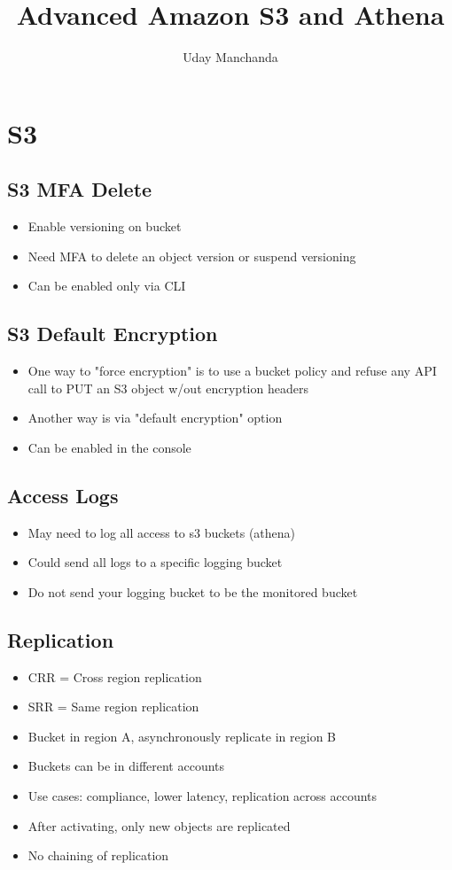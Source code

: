\documentclass[]{scrartcl}
\title{Advanced Amazon S3 and Athena}
\author{Uday Manchanda}
\begin{document}
\maketitle

\section{S3}

\subsection{S3 MFA Delete}
\begin{itemize}
	\item Enable versioning on bucket
	\item Need MFA to delete an object version or suspend versioning
	\item Can be enabled only via CLI
\end{itemize}

\subsection{S3 Default Encryption}
\begin{itemize}
	\item One way to "force encryption" is to use a bucket policy and refuse any API call to PUT an S3 object w/out encryption headers
	\item Another way is via "default encryption" option
	\item Can be enabled in the console
\end{itemize}

\subsection{Access Logs}
\begin{itemize}
	\item May need to log all access to s3 buckets (athena)
	\item Could send all logs to a specific logging bucket
	\item Do not send your logging bucket to be the monitored bucket
\end{itemize}

\subsection{Replication}
\begin{itemize}
	\item CRR = Cross region replication
	\item SRR = Same region replication
	\item Bucket in region A, asynchronously replicate in region B
	\item Buckets can be in different accounts
	\item Use cases: compliance, lower latency, replication across accounts
	\item After activating, only new objects are replicated
	\item No chaining of replication
\end{itemize}
\end{document}
